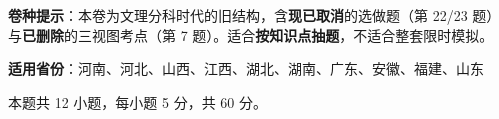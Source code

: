 

\begin{gknotice}
\textbf{ 卷种提示}：本卷为文理分科时代的旧结构，含\textbf{现已取消}的选做题（第 22/23 题）与\textbf{已删除}的三视图考点（第 7 题）。适合\textbf{按知识点抽题}，不适合整套限时模拟。

\textbf{适用省份}：河南、河北、山西、江西、湖北、湖南、广东、安徽、福建、山东
\end{gknotice}

\par\medskip

\Needspace{0.4\textheight}


\begin{gktip}
本题共 12 小题，每小题 5 分，共 60 分。
\end{gktip}

